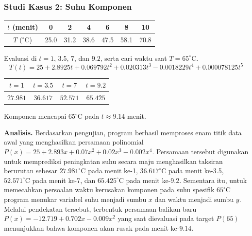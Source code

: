 \subsubsection{Studi Kasus 2: Suhu Komponen}
\begin{kasus}
\begin{center}
\begin{tabular}{c|cccccc}
$t$ (menit) & 0 & 2 & 4 & 6 & 8 & 10 \\ \hline
$T$ ($^\circ$C) & 25.0 & 31.2 & 38.6 & 47.5 & 58.1 & 70.8
\end{tabular}
\end{center}
Evaluasi di $t = 1$, $3.5$, $7$, dan $9.2$, serta cari waktu saat $T = 65^\circ$C.
\[
T(t) = 25 + 2.8925t + 0.069792t^2 + 0.020313t^3 - 0.0018229t^4 + 0.000078125t^5
\]
\begin{center}
\begin{tabular}{cccc}
\toprule
$t = 1$ & $t = 3.5$ & $t = 7$ & $t = 9.2$ \\
\midrule
$27.981$ & $36.617$ & $52.571$ & $65.425$ \\
\bottomrule
\end{tabular}
\end{center}
Komponen mencapai $65^\circ$C pada $t \approx 9.14$ menit.
\begin{center}
    \begin{minipage}{0.48\textwidth}
        \centering
    \end{minipage}\hfill
    \begin{minipage}{0.48\textwidth}
        \centering
    \end{minipage}\hfill
    \begin{minipage}{0.48\textwidth}
        \centering
    \end{minipage}
\end{center}
\end{kasus}

\textbf{Analisis.} Berdasarkan pengujian, program berhasil memproses enam titik data awal yang menghasilkan persamaan polinomial $P(x) = 25 + 2.893x + 0.07x^2 + 0.02x^3 - 0.002x^4$. Persamaan  tersebut digunakan  untuk memprediksi peningkatan suhu secara maju menghasilkan taksiran berurutan sebesar $27.981^\circ\text{C}$ pada menit ke-1, $36.617^\circ\text{C}$ pada menit ke-3.5, $52.571^\circ\text{C}$ pada menit ke-7, dan $65.425^\circ\text{C}$ pada menit ke-9.2. Sementara itu, untuk memecahkan persoalan waktu kerusakan komponen pada suhu spesifik $65^\circ\text{C}$  program  menukar variabel suhu menjadi sumbu $x$ dan waktu menjadi sumbu $y$. Melalui pendekatan tersebut, terbentuk persamaan balikan baru $P(x) = -12.719 + 0.702x - 0.009x^2$ yang saat dievaluasi pada target $P(65)$ menunjukkan bahwa komponen akan rusak pada menit ke-9.14.

